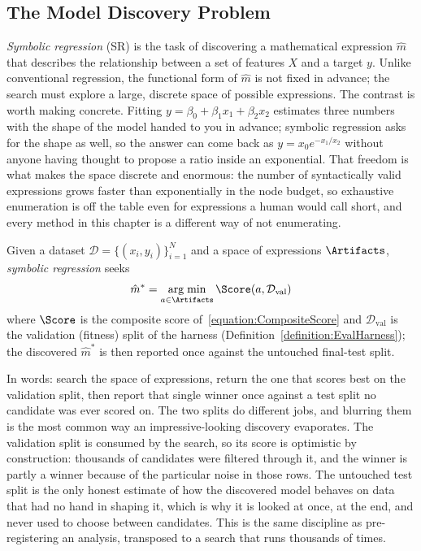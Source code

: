 \subsection{The Model Discovery Problem}

\emph{Symbolic regression} (SR) is the task of discovering a mathematical expression $\hat{m}$ that describes the relationship between a set of features $X$ and a target $y$.
Unlike conventional regression, the functional form of $\hat{m}$ is not fixed in advance; the search must explore a large, discrete space of possible expressions.
The contrast is worth making concrete.
Fitting $y = \beta_0 + \beta_1 x_1 + \beta_2 x_2$ estimates three numbers with the shape of the model handed to you in advance; symbolic regression asks for the shape as well, so the answer can come back as $y = x_0 e^{-x_1 / x_2}$ without anyone having thought to propose a ratio inside an exponential.
That freedom is what makes the space discrete and enormous: the number of syntactically valid expressions grows faster than exponentially in the node budget, so exhaustive enumeration is off the table even for expressions a human would call short, and every method in this chapter is a different way of not enumerating.

\begin{definition}
\label{definition:SymbolicRegression}
Given a dataset $\mathcal{D} = \{(x_i, y_i)\}_{i=1}^{N}$ and a space of expressions $\Artifacts$, \emph{symbolic regression} seeks
\begin{equation}
\hat{m}^* = \operatorname*{arg\;min}_{a \in \Artifacts} \Score(a, \mathcal{D}_{\mathrm{val}})
\end{equation}
where $\Score$ is the composite score of~\eqref{equation:CompositeScore} and $\mathcal{D}_{\mathrm{val}}$ is the validation (fitness) split of the harness (Definition~\ref{definition:EvalHarness}); the discovered $\hat{m}^*$ is then reported once against the untouched final-test split.
\end{definition}

In words: search the space of expressions, return the one that scores best on the validation split, then report that single winner once against a test split no candidate was ever scored on.
The two splits do different jobs, and blurring them is the most common way an impressive-looking discovery evaporates.
The validation split is consumed by the search, so its score is optimistic by construction: thousands of candidates were filtered through it, and the winner is partly a winner because of the particular noise in those rows.
The untouched test split is the only honest estimate of how the discovered model behaves on data that had no hand in shaping it, which is why it is looked at once, at the end, and never used to choose between candidates.
This is the same discipline as pre-registering an analysis, transposed to a search that runs thousands of times.


